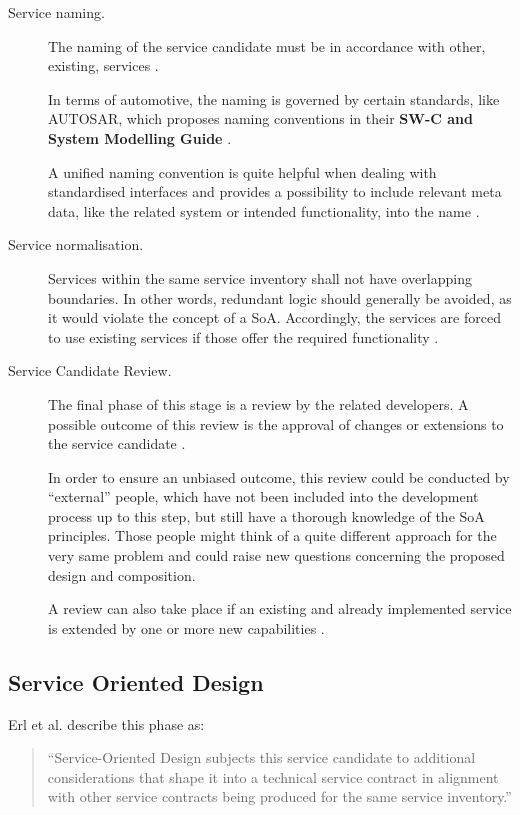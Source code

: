 \begin{description}
	\item [Service naming.]
	The naming of the service candidate must be in accordance with other, existing, services \cite[p.206]{erl2011}.

	In terms of automotive, the naming is governed by certain standards, like \mbox{AUTOSAR}, which proposes naming conventions in their \textbf{SW-C and System Modelling Guide} \cite{autosar_system_modelling}.

	A unified naming convention is quite helpful when dealing with standardised interfaces and provides a possibility to include relevant meta data, like the related system or intended functionality, into the name \cite{rehner2013}.

	\item [Service normalisation.]
	Services within the same service inventory shall not have overlapping boundaries. In other words, redundant logic should generally be avoided, as it would violate the concept of a SoA. Accordingly, the services are forced to use existing services if those offer the required functionality \cite[p.207]{erl2011}.

	\item [Service Candidate Review.]
	The final phase of this stage is a review by the related developers. A possible outcome of this review is the approval of changes or extensions to the service candidate \cite[p.210]{erl2011}.

	In order to ensure an unbiased outcome, this review could be conducted by ``external'' people, which have not been included into the development process up to this step, but still have a thorough knowledge of the SoA principles. Those people might think of a quite different approach for the very same problem and could raise new questions concerning the proposed design and composition.

	A review can also take place if an existing and already implemented service is extended by one or more new capabilities \cite[p.210]{erl2011}.
\end{description}




\subsection{Service Oriented Design}

Erl et al. \cite[p.86]{erl2011} describe this phase as:
\begin{quote}
``Service-Oriented Design subjects this service candidate to additional considerations that shape it into a technical service contract in alignment with other service contracts being produced for the same service inventory.''
\end{quote}


